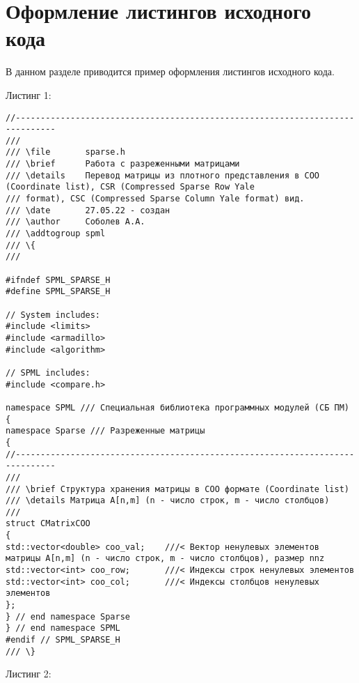 \newpage\section{Оформление листингов исходного кода}

В данном разделе приводится пример оформления листингов исходного кода.

Листинг 1:

\begin{lstlisting}
//------------------------------------------------------------------------------
///
/// \file       sparse.h
/// \brief      Работа с разреженными матрицами
/// \details    Перевод матрицы из плотного представления в COO (Coordinate list), CSR (Compressed Sparse Row Yale
/// format), CSC (Compressed Sparse Column Yale format) вид.
/// \date       27.05.22 - создан
/// \author     Соболев А.А.
/// \addtogroup spml
/// \{
///

#ifndef SPML_SPARSE_H
#define SPML_SPARSE_H

// System includes:
#include <limits>
#include <armadillo>
#include <algorithm>

// SPML includes:
#include <compare.h>

namespace SPML /// Специальная библиотека программных модулей (СБ ПМ)
{
namespace Sparse /// Разреженные матрицы
{
//------------------------------------------------------------------------------
///
/// \brief Структура хранения матрицы в COO формате (Coordinate list)
/// \details Матрица A[n,m] (n - число строк, m - число столбцов)
///
struct CMatrixCOO
{
std::vector<double> coo_val;    ///< Вектор ненулевых элементов матрицы A[n,m] (n - число строк, m - число столбцов), размер nnz
std::vector<int> coo_row;       ///< Индексы строк ненулевых элементов
std::vector<int> coo_col;       ///< Индексы столбцов ненулевых элементов
};
} // end namespace Sparse
} // end namespace SPML
#endif // SPML_SPARSE_H
/// \}
\end{lstlisting}

\newpage
Листинг 2:


